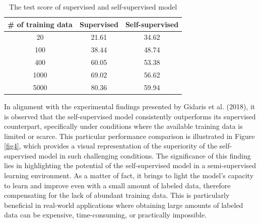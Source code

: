 \documentclass[10pt]{article}
\begin{document}
\begin{table}[!h]
    \begin{center}
        \begin{tabular}{ccc}
            \textbf{\# of training data} & \textbf{Supervised} & \textbf{Self-supervised} \\ \hline
            20                           & 21.61               & 34.62                    \\
            100                          & 38.44               & 48.74                    \\
            400                          & 60.05               & 53.38                    \\
            1000                         & 69.02               & 56.62                    \\
            5000                         & 80.36               & 59.94                   
            \end{tabular}
    \end{center}
    \caption{The test score of supervised and self-supervised model}
\end{table}

In alignment with the experimental findings presented by Gidaris et al. (2018), it is observed that the self-supervised model consistently outperforms its supervised counterpart, specifically under conditions where the available training data is limited or scarce. This particular performance comparison is illustrated in Figure \ref{fig4}, which provides a visual representation of the superiority of the self-supervised model in such challenging conditions.
The significance of this finding lies in highlighting the potential of the self-supervised model in a semi-supervised learning environment. As a matter of fact, it brings to light the model's capacity to learn and improve even with a small amount of labeled data, therefore compensating for the lack of abundant training data. This is particularly beneficial in real-world applications where obtaining large amounts of labeled data can be expensive, time-consuming, or practically impossible.


\appendix
\end{document}
